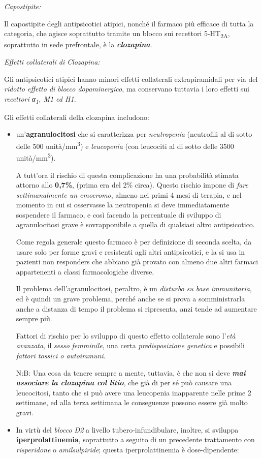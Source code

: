 \documentclass[]{article}
\begin{document}
\emph{\emph{Capostipite:}}

Il capostipite degli antipsicotici atipici, nonché il farmaco più
efficace di tutta la categoria, che agisce soprattutto tramite un blocco
sui recettori 5-HT\textsubscript{2A}, soprattutto in sede prefrontale, è
la \textbf{\emph{clozapina}}.

\emph{\emph{Effetti collaterali di Clozapina:}}

Gli antipsicotici atipici hanno minori effetti collaterali
extrapiramidali per via del \emph{ridotto effetto di blocco
dopaminergico}, ma conservano tuttavia i loro effetti sui
\emph{recettori α\textsubscript{1}, M1 ed H1.}

Gli effetti collaterali della clozapina includono:

\begin{itemize}
\item
  un'\textbf{agranulocitosi} che si caratterizza per \emph{neutropenia}
  (neutrofili al di sotto delle 500 unità/mm\textsuperscript{3}) e
  \emph{leucopenia} (con leucociti al di sotto delle 3500
  unità/mm\textsuperscript{3}).

  A tutt'ora il rischio di questa complicazione ha una probabilità
  stimata attorno allo \textbf{0,7\%}, (prima era del 2\% circa). Questo
  rischio impone di \emph{fare settimanalmente un emocromo}, almeno nei
  primi 4 mesi di terapia, e nel momento in cui si osservasse la
  neutropenia si deve immediatamente sospendere il farmaco, e così
  facendo la percentuale di sviluppo di agranulocitosi grave è
  sovrapponibile a quella di qualsiasi altro antipsicotico.

  Come regola generale questo farmaco è per definizione di seconda
  scelta, da usare solo per forme gravi e resistenti agli altri
  antipsicotici, e la si usa in pazienti non responders che abbiano già
  provato con almeno due altri farmaci appartenenti a classi
  farmacologiche diverse.

  Il problema dell'agranulocitosi, peraltro, è un \emph{disturbo su base
  immunitaria}, ed è quindi un grave problema, perché anche se si prova
  a somministrarla anche a distanza di tempo il problema si ripresenta,
  anzi tende ad aumentare sempre più.

  Fattori di rischio per lo sviluppo di questo effetto collaterale sono
  l'\emph{età avanzata}, il \emph{sesso} \emph{femminile}, una certa
  \emph{predisposizione genetica} e possibili \emph{fattori tossici o
  autoimmuni}.

  N:B: Una cosa da tenere sempre a mente, tuttavia, è che non si deve
  \textbf{\emph{mai associare la clozapina col litio}}, che già di per
  sé può causare una leucocitosi, tanto che si può avere una leucopenia
  inapparente nelle prime 2 settimane, ed alla terza settimana le
  conseguenze possono essere già molto gravi.
\item
  In virtù del \emph{blocco D2} a livello tubero-infundibulare, inoltre,
  si sviluppa \textbf{iperprolattinemia}, soprattutto a seguito di un
  precedente trattamento con \emph{risperidone} o \emph{amilsulpiride};
  questa iperprolattinemia è dose-dipendente:


\end{itemize}
\end{document}
